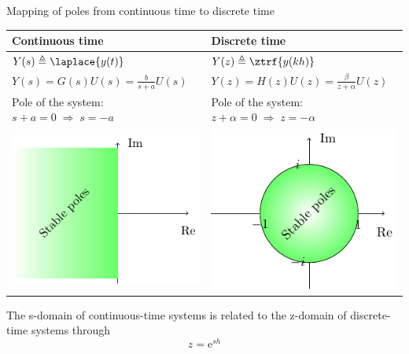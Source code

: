 \documentclass[presentation,aspectratio=169]{beamer}
\begin{document}
\begin{frame}[label={sec:org6dc2ec2}]{Mapping of poles from continuous time to discrete time}
\begin{center}
\begin{tabular}{ll}
Continuous time & Discrete time\\
\hline
\(Y(s) \triangleq \laplace{y(t)}\) & \(Y(z) \triangleq \ztrf{y(kh)}\)\\
\(Y(s) = G(s)U(s) = \frac{b}{s+a}U(s)\) & \(Y(z) = H(z)U(z) = \frac{\beta}{z+\alpha}U(z)\)\\
Pole of the system: \(s+a=0 \; \Rightarrow \; s = -a\) & Pole of the system: \(z+\alpha = 0 \; \Rightarrow \; z = -\alpha\)\\
\includegraphics[width=0.22\linewidth]{../../figures/cont-stable} & \includegraphics[width=0.22\linewidth]{../../figures/discrete-stable}\\
\hline
\end{tabular}
\end{center}

The \alert{s-domain} of continuous-time systems is related to the \alert{z-domain} of discrete-time systems through  \[z = \mathrm{e}^{sh}\]
\end{frame}
\end{document}
